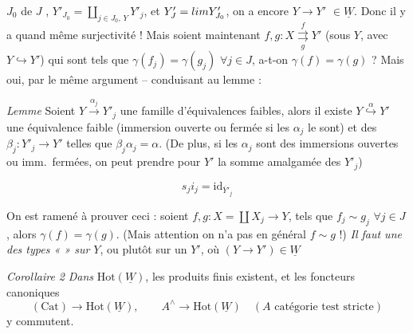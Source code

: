 \documentclass[11pt,a4paper]{article}
\begin{document}

$J_0$ de $J$ , $Y'_{J_0} = \coprod_{j \in J_0,\, Y} Y'_j$,
et $Y'_J = \varinjlim Y'_{J_0}$, on a encore $Y \to Y'$ $\in
\underline{W}$. Donc il y a quand même
surjectivité ! Mais soient maintenant $f, g : X
\overset{f}{\underset{g}{\rightrightarrows}} Y'$ (sous $Y$, avec
$Y \hookrightarrow Y'$) qui  sont tels que $\gamma(f_j) =
\gamma(g_j)$ $\forall j \in J$, a-t-on $\gamma(f) = \gamma(g)$ ? Mais oui,
par le même argument -- conduisant au lemme :
\marginal{\ill{} \ill{} !}

\emph{Lemme} Soient $Y \xrightarrow{\alpha_j} Y'_j$  une
famille d'équivalences faibles, alors il existe $Y
\overset{\alpha}{\hookrightarrow} Y'$ une équivalence faible  (immersion ouverte ou fermée si les $\alpha_j$ le sont)
 et des $\beta_j : Y'_j \to Y'$ telles que $\beta_j
\alpha_j = \alpha$. (De plus, si les $\alpha_j$ sont des immersions
ouvertes ou imm.\ fermées, on peut prendre pour $Y'$ la somme amalgamée des
$Y'_j$)


\[
  s_j i_j = \mathrm{id}_{\overline{Y}'_j}
\]

On est ramené à prouver ceci : soient $f, g : X = \coprod X_j \to Y$,
tels que $f_j \sim g_j$ $\forall j \in J$, alors $\gamma(f) = \gamma(g)$.
(Mais attention on n'a pas en général $f \sim g$ !) \emph{Il faut une
 \ill{} des types «  » sur $Y$}, ou
plutôt sur un $Y'$, où $(Y \to Y') \in \underline{W}$


\emph{Corollaire 2} \emph{Dans} $\mathrm{Hot}(\underline{W})$, les
produits finis existent, et les foncteurs canoniques
\[
  (\mathrm{Cat}) \to \mathrm{Hot}(\underline{W}), \qquad
  A^{\wedge} \to \mathrm{Hot}(\underline{W}) \quad (A \text{ catégorie test
  stricte})
\]
y commutent.
\end{document}
